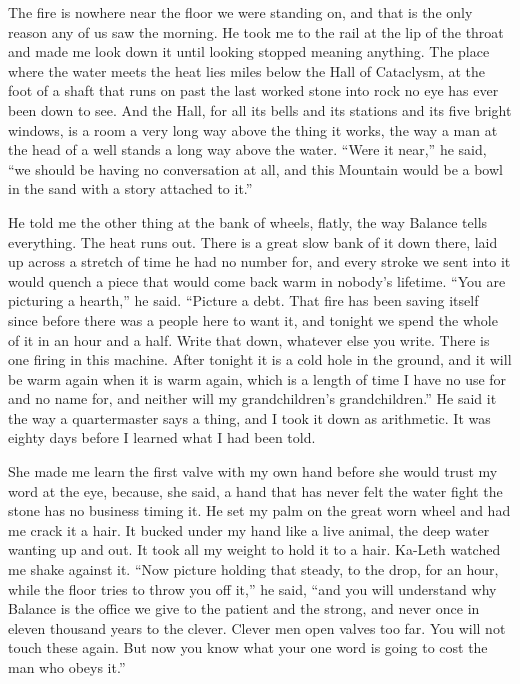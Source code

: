 The fire is nowhere near the floor we were standing on, and that is the only reason any of us saw the morning. He took me to the rail at the lip of the throat and made me look down it until looking stopped meaning anything. The place where the water meets the heat lies miles below the Hall of Cataclysm, at the foot of a shaft that runs on past the last worked stone into rock no eye has ever been down to see. And the Hall, for all its bells and its stations and its five bright windows, is a room a very long way above the thing it works, the way a man at the head of a well stands a long way above the water. ``Were it near,'' he said, ``we should be having no conversation at all, and this Mountain would be a bowl in the sand with a story attached to it.''\par

He told me the other thing at the bank of wheels, flatly, the way Balance tells everything. The heat runs out. There is a great slow bank of it down there, laid up across a stretch of time he had no number for, and every stroke we sent into it would quench a piece that would come back warm in nobody's lifetime. ``You are picturing a hearth,'' he said. ``Picture a debt. That fire has been saving itself since before there was a people here to want it, and tonight we spend the whole of it in an hour and a half. Write that down, whatever else you write. There is one firing in this machine. After tonight it is a cold hole in the ground, and it will be warm again when it is warm again, which is a length of time I have no use for and no name for, and neither will my grandchildren's grandchildren.'' He said it the way a quartermaster says a thing, and I took it down as arithmetic. It was eighty days before I learned what I had been told.\par

She made me learn the first valve with my own hand before she would trust my word at the eye, because, she said, a hand that has never felt the water fight the stone has no business timing it. He set my palm on the great worn wheel and had me crack it a hair. It bucked under my hand like a live animal, the deep water wanting up and out. It took all my weight to hold it to a hair. Ka-Leth watched me shake against it. ``Now picture holding that steady, to the drop, for an hour, while the floor tries to throw you off it,'' he said, ``and you will understand why Balance is the office we give to the patient and the strong, and never once in eleven thousand years to the clever. Clever men open valves too far. You will not touch these again. But now you know what your one word is going to cost the man who obeys it.''\par

